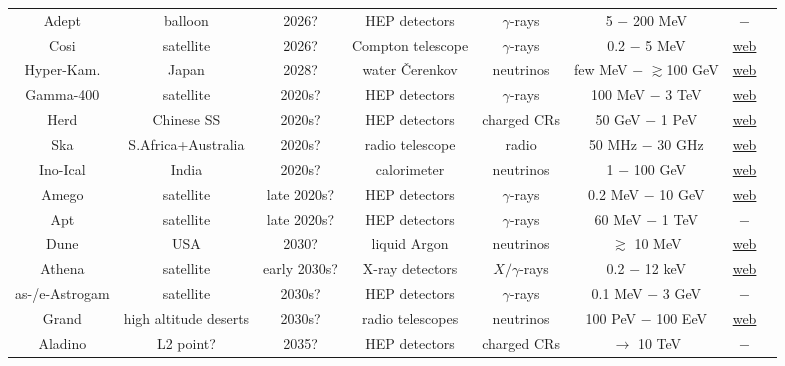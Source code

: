 \begin{table}[p]
\begin{center}
{\begin{tabular}{cccccccc}
 {\sc  Adept} & balloon & 2026? & HEP detectors & $\gamma$-rays & 5 $-$ 200 MeV & $-$ & \cite{Adept} \\
{\sc  Cosi} & satellite & 2026? & Compton telescope & $\gamma$-rays & 0.2 $-$ 5 MeV& \href{http://cosi.ssl.berkeley.edu/}{web} & \cite{Cosi} \\
{\sc  Hyper-Kam.} & Japan & 2028? & water \v Cerenkov & neutrinos &  few MeV $-$ $\gtrsim$100 GeV  & \href{https://www.hyperk.org/}{web} & \cite{HyperK} \\
{\sc  Gamma-400} & satellite & 2020s? & HEP detectors & $\gamma$-rays & 100 MeV $-$ 3 TeV & \href{http://gamma400.lebedev.ru/indexeng.html}{web} & \cite{Gamma-400} \\
{\sc  Herd} & Chinese SS & 2020s? & HEP detectors & charged CRs & 50 GeV $-$ 1 PeV & \href{http://herd.ihep.ac.cn}{web} & \cite{Herd} \\
{\sc  Ska} & S.Africa+Australia & 2020s? & radio telescope & radio & 50 MHz $-$ 30 GHz  & \href{http://skatelescope.org}{web} &\cite{Ska} \\
{\sc  Ino-Ical} & India & 2020s? & calorimeter & neutrinos & 1 $-$ 100 GeV & \href{http://www.ino.tifr.res.in/ino/}{web} &\cite{Ino-Ical} \\
{\sc  Amego} & satellite & late 2020s? & HEP detectors & $\gamma$-rays & 0.2 MeV $-$ 10 GeV & \href{https://asd.gsfc.nasa.gov/amego/index.html}{web} & \cite{Amego} \\
{\sc  Apt} & satellite & late 2020s? & HEP detectors & $\gamma$-rays & 60 MeV $-$ 1 TeV & $-$ & \cite{APT} \\
{\sc  Dune} & USA & 2030? & liquid Argon & neutrinos & $\gtrsim$ 10 MeV & \href{https://www.dunescience.org}{web} & \cite{DUNE} \\
{\sc  Athena} & satellite & early 2030s? & X-ray detectors & $X/\gamma$-rays & 0.2 $-$ 12 keV& \href{https://www.cosmos.esa.int/web/athena}{web} & \cite{Athena} \\
{\sc  as-/e-Astrogam} & satellite & 2030s? & HEP detectors & $\gamma$-rays & 0.1 MeV $-$ 3 GeV & $-$  & \cite{eAstrogam} \\
{\sc  Grand} & high altitude deserts & 2030s? & radio telescopes & neutrinos & 100 PeV $-$ 100 EeV &  \href{https://grand.cnrs.fr}{web}  & \cite{GRAND} \\
{\sc  Aladino} & L2 point? & 2035? & HEP detectors & charged CRs & $\to$ 10 TeV & $-$ & \cite{Aladino} \\

\end{tabular}}
\end{center}
\end{table}
